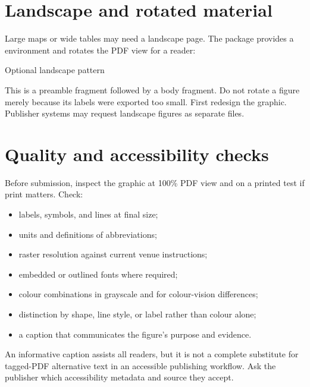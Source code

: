 \section{Landscape and rotated material}

Large maps or wide tables may need a landscape page. The 
package provides a  environment and rotates the PDF view for a
reader:

\begin{latexcode}{Optional landscape pattern}
\usepackage{pdflscape}

\begin{landscape}
\end{landscape}
\end{latexcode}

This is a preamble fragment followed by a body fragment. Do not rotate a figure
merely because its labels were exported too small. First redesign the graphic.
Publisher systems may request landscape figures as separate files.

\section{Quality and accessibility checks}

Before submission, inspect the graphic at 100\% PDF view and on a printed test
if print matters. Check:

\begin{itemize}
  \item labels, symbols, and lines at final size;
  \item units and definitions of abbreviations;
  \item raster resolution against current venue instructions;
  \item embedded or outlined fonts where required;
  \item colour combinations in grayscale and for colour-vision differences;
  \item distinction by shape, line style, or label rather than colour alone;
  \item a caption that communicates the figure's purpose and evidence.
\end{itemize}

An informative caption assists all readers, but it is not a complete substitute
for tagged-PDF alternative text in an accessible publishing workflow. Ask the
publisher which accessibility metadata and source they accept.

